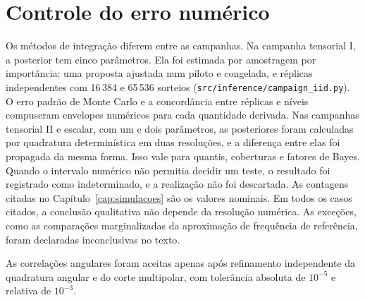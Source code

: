 \section{Controle do erro numérico}

Os métodos de integração diferem entre as campanhas. Na campanha
tensorial I, a posterior tem cinco parâmetros. Ela foi estimada por
amostragem por importância: uma proposta ajustada num piloto e
congelada, e réplicas independentes com 16\,384 e 65\,536 sorteios
(\texttt{src/inference/campaign\_iid.py}). O erro padrão de Monte Carlo e
a concordância entre réplicas e níveis compuseram envelopes numéricos
para cada quantidade derivada. Nas campanhas tensorial II e escalar,
com um e dois parâmetros, as posteriores foram calculadas por quadratura
determinística em duas resoluções, e a diferença entre elas foi
propagada da mesma forma. Isso vale para quantis, coberturas e fatores
de Bayes. Quando o intervalo numérico não permitia decidir um teste, o
resultado foi registrado como indeterminado, e a realização não foi
descartada. As contagens citadas no Capítulo~\ref{cap:simulacoes} são
os valores nominais. Em todos os casos citados, a conclusão qualitativa
não depende da resolução numérica. As exceções, como as comparações
marginalizadas da aproximação de frequência de referência, foram
declaradas inconclusivas no texto.

As correlações angulares foram aceitas apenas após refinamento
independente da quadratura angular e do corte multipolar, com tolerância
absoluta de $10^{-5}$ e relativa de $10^{-3}$.
